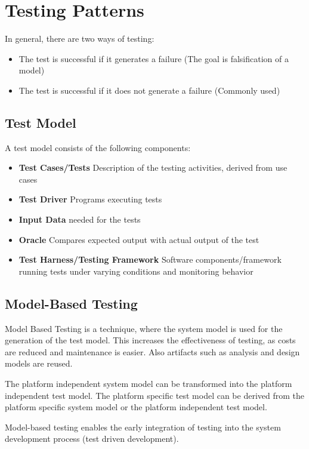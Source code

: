 
\section{Testing Patterns}
In general, there are two ways of testing:
\begin{itemize}
	\item The test is successful if it generates a failure (The goal is falsification of a model)
	\item The test is successful if it does not generate a failure (Commonly used)
\end{itemize}

\subsection{Test Model}
A test model consists of the following components:
\begin{itemize}
	\item \textbf{Test Cases/Tests} Description of the testing activities, derived from use cases
	\item \textbf{Test Driver} Programs executing tests
	\item \textbf{Input Data} needed for the tests
	\item \textbf{Oracle} Compares expected output with actual output of the test
	\item \textbf{Test Harness/Testing Framework} Software components/framework running tests under varying conditions and monitoring behavior
\end{itemize}
\newpage

\subsection{Model-Based Testing}
Model Based Testing is a technique, where the system model is used for the generation of the test model.
This increases the effectiveness of testing, as costs are reduced and maintenance is easier.
Also artifacts such as analysis and design models are reused.
\newline

The platform independent system model can be transformed into the platform independent test model.
The platform specific test model can be derived from the platform specific system model or the platform independent test model.

Model-based testing enables the early integration of testing into the
system development process (test driven development).

